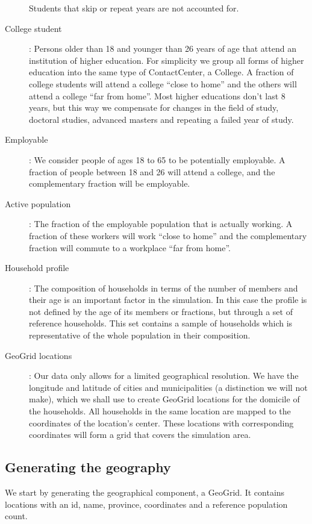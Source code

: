 \begin{description}
    		Students that skip or repeat years are not accounted for.
    \item[College student]:
        Persons older than 18 and younger than 26 years of age that attend an institution of higher education. 
        For simplicity we group all forms of higher education into the same type of ContactCenter, a College. 
        A fraction of college students will attend a college ``close to home'' and the others will attend a 
        college ``far from home''. Most higher educations don't last 8 years, but this way we compensate 
        for changes in the field of study, doctoral studies, advanced masters and repeating a failed year of study.
    \item[Employable]:
        We consider people of ages 18 to 65 to be potentially employable. A fraction of people between 18 and 26 
        will attend a college, and the complementary fraction will be employable.
    \item[Active population]:
        The fraction of the employable population that is actually working. A fraction of these workers will 
        work ``close to home'' and the complementary fraction will commute to a workplace ``far from home''.
    \item[Household profile]:
        The composition of households in terms of the number of members and their age is an important 
        factor in the simulation. In this case the profile is not defined by the age of its members or fractions, 
        but through a set of reference households. This set contains a sample of households which is 
        representative of the whole population in their composition.
    \item[GeoGrid locations]:
        Our data only allows for a limited geographical resolution. We have the longitude and latitude of cities 
        and municipalities (a distinction we will not make), which we shall use to create GeoGrid locations for 
        the domicile of the households. All households in the same location are mapped to the coordinates 
        of the location's center. These locations with corresponding coordinates will form a grid that covers 
        the simulation area.
\end{description}

\subsection{Generating the geography}
\label{subsection:gengeo}
We start by generating the geographical component, a GeoGrid.
It contains locations with an id, name, province, coordinates and a reference population count.

